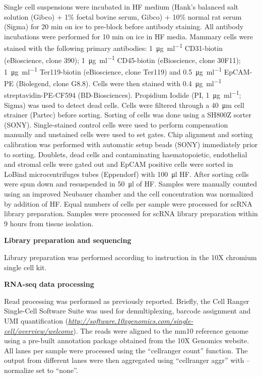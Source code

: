 \documentclass[titlepage, 12pt, oneside]{amsart}
\begin{document}
Single cell suspensions were incubated in HF medium (Hank's balanced salt solution (Gibco) + 1\% foetal bovine serum, Gibco) + 10\% normal rat serum (Sigma) for 20 min on ice to pre-block before antibody staining.
All antibody incubations were performed for 10 min on ice in HF media.
Mammary cells were stained with the following primary antibodies: \SI{1}{\micro\gram\per\milli\litre} CD31-biotin (eBioscience, clone 390); \SI{1}{\micro\gram\per\milli\litre} CD45-biotin (eBioscience, clone 30F11); \SI{1}{\micro\gram\per\milli\litre} Ter119-biotin (eBioscience, clone Ter119) and \SI{0.5}{\micro\gram\per\milli\litre} EpCAM-PE (Biolegend, clone G8.8).
Cells were then stained with \SI{0.4}{\micro\gram\per\milli\litre} streptavidin-PE-CF594 (BD-Biosciences).
Propidium Iodide (PI, \SI{1}{\micro\gram\per\milli\litre}; Sigma) was used to detect dead cells.
Cells were filtered through a \SI{40}{\micro\meter} cell strainer (Partec) before sorting.
Sorting of cells was done using a SH800Z sorter (SONY).
Single-stained control cells were used to perform compensation manually and unstained cells were used to set gates.
Chip alignment and sorting calibration was performed with automatic setup beads (SONY) immediately prior to sorting.
Doublets, dead cells and contaminating haematopoietic, endothelial and stromal cells were gated out and EpCAM positive cells were sorted in LoBind\textsuperscript{\textregistered} microcentrifuges tubes (Eppendorf) with \SI{100}{\micro\litre} HF.
After sorting cells were spun down and resuspended in \SI{50}{\micro\litre} of HF. 
Samples were manually counted using an improved Neubauer chamber and the cell concentration was normalized by addition of HF.
Equal numbers of cells per sample were processed for scRNA library preparation.
Samples were processed for scRNA library preparation within 9 hours from tissue isolation.

\textbf{Library preparation and sequencing}

Library preparation was performed according to instruction in the 10X chromium single cell kit.

\textbf{RNA-seq data processing }

Read processing was performed as previously reported\autocite{Zheng2017}.
Briefly, the Cell Ranger Single-Cell Software Suite was used for demultiplexing, barcode assignment and UMI quantification (\href{http://software.10xgenomics.com/single-cell/overview/welcome}{\textit{http://software.10xgenomics.com/single-cell/overview/welcome}}).
The reads were aligned to the mm10 reference genome using a pre-built annotation package obtained from the 10X Genomics website.
All lanes per sample were processed using the ``cellranger count'' function.
The output from different lanes were then aggregated using ``cellranger aggr'' with --normalize set to ``none''.
\end{document}
